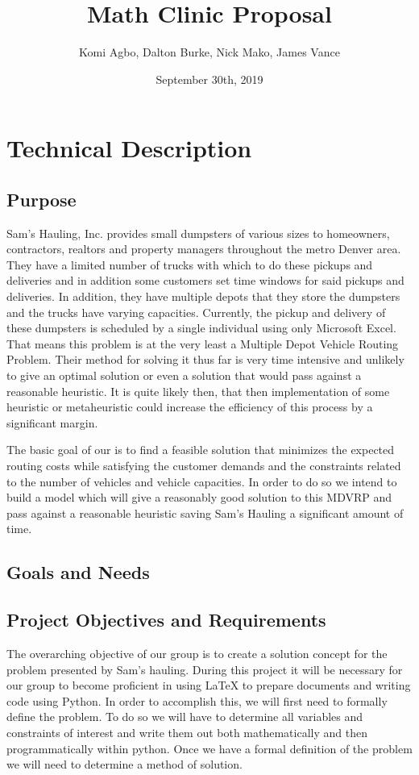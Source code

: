 \documentclass{article}
\title{Math Clinic Proposal}
\author{Komi Agbo, Dalton Burke, Nick Mako, James Vance}
\date{September 30th, 2019}
\begin{document}
\maketitle
\newpage

\section{Technical Description}

\subsection{Purpose}
Sam’s Hauling, Inc. provides small dumpsters of various sizes to homeowners, contractors, realtors and property managers throughout the metro Denver area. They have a limited number of trucks with which to do these pickups and deliveries and in addition some customers set time windows for said pickups and deliveries. In addition, they have multiple depots that they store the dumpsters and the trucks have varying capacities. Currently, the pickup and delivery of these dumpsters is scheduled by a single individual using only Microsoft Excel. That means this problem is at the very least a Multiple Depot Vehicle Routing Problem. Their method for solving it thus far is very time intensive and unlikely to give an optimal solution or even a solution that would pass against a reasonable heuristic. It is quite likely then, that then implementation of some heuristic or metaheuristic could increase the efficiency of this process by a significant margin.

The basic goal of our is to find a feasible solution that minimizes the expected routing costs while satisfying the customer demands and the constraints related to the number of vehicles and vehicle capacities. In order to do so we intend to build a model which will give a reasonably good solution to this MDVRP and pass against a reasonable heuristic saving Sam’s Hauling a significant amount of time.


\subsection{Goals and Needs}

\subsection{Project Objectives and Requirements}
The overarching objective of our group is to create a solution concept for the problem presented by Sam's hauling.
During this project it will be necessary for our group to become proficient in using LaTeX to prepare documents and writing code using Python.
In order to accomplish this, we will first need to formally define the problem. To do so we will have to determine all variables and constraints of interest and write them out both mathematically and then programmatically within python.
Once we have a formal definition of the problem we will need to determine a method of solution.
\end{document}
